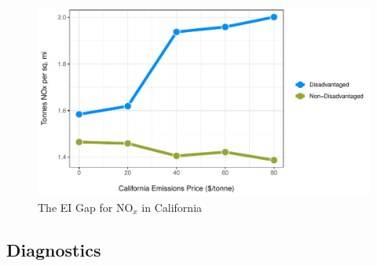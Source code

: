 \begin{figure}
    \centering
    \caption{The EI Gap for NO$_x$ in California}
    \includegraphics[width=\textwidth]{figures/chapter5_figures/ei_gap_bca_nox.pdf}
\end{figure}




\subsection{Diagnostics}





